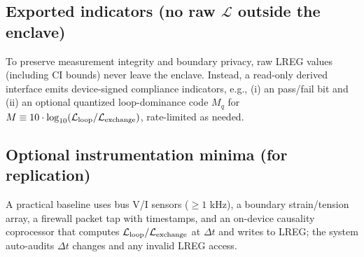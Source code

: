 \documentclass[11pt]{article}
\begin{document}
\subsection{Exported indicators (no raw $\mathcal{L}$ outside the enclave)}

To preserve measurement integrity and boundary privacy, raw LREG values (including CI bounds) never leave the enclave. Instead, a read-only derived interface emits device-signed compliance indicators, e.g., (i) an \NC pass/fail bit and (ii) an optional quantized loop-dominance code $M_q$ for $M \equiv 10 \cdot \log_{10}(\mathcal{L}_{\text{loop}}/\mathcal{L}_{\text{exchange}})$, rate-limited as needed.

\subsection{Optional instrumentation minima (for replication)}

A practical baseline uses bus V/I sensors ($\geq 1$ kHz), a boundary strain/tension array, a firewall packet tap with timestamps, and an on-device causality coprocessor that computes $\mathcal{L}_{\text{loop}}/\mathcal{L}_{\text{exchange}}$ at $\Delta t$ and writes to LREG; the system auto-audits $\Delta t$ changes and any invalid LREG access.



\end{document}
